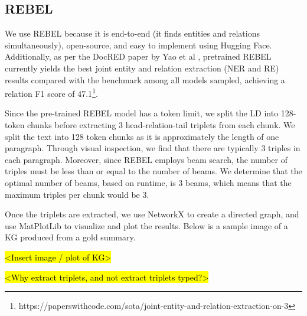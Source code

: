 \subsection*{REBEL}
We use REBEL because it is end-to-end (it finds entities and relations simultaneously), open-source, and easy to implement using Hugging Face. Additionally, as per the DocRED paper by Yao et al \cite{yao2019DocRED}, pretrained REBEL currently yields the best joint entity and relation extraction (NER and RE) results compared with the benchmark among all models sampled, achieving a relation F1 score of 47.1\footnote{https://paperswithcode.com/sota/joint-entity-and-relation-extraction-on-3}.


Since the pre-trained REBEL model has a token limit, we split the LD into 128-token chunks before extracting 3 head-relation-tail triplets from each chunk. We split the text into 128 token chunks as it is approximately the length of one paragraph. Through visual inspection, we find that there are typically 3 triples in each paragraph. Moreover, since REBEL employs beam search, the number of triples must be less than or equal to the number of beams. We determine that the optimal number of beams, based on runtime, is 3 beams, which means that the maximum triples per chunk would be 3.


Once the triplets are extracted, we use NetworkX to create a directed graph, and use MatPlotLib to visualize and plot the results. Below is a sample image of a KG produced from a gold summary.


\hl{<Insert image / plot of KG>}


\hl{<Why extract triplets, and not extract triplets typed?>}
